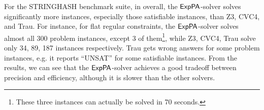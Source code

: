 

For the STRINGHASH benchmark suite, in overall, the ${\sf ExpPA}$-solver solves significantly more instances, especially those satisfiable instances, than Z3, CVC4, and Trau. For instance, for flat regular constraints, the ${\sf ExpPA}$-solver solves almost all 300 problem instances, except 3 of them\footnote{These three instances can actually be solved in 70 seconds.}, while  Z3, CVC4, Trau solve only 34, 89, 187 instances respectively.  Trau gets wrong answers for some problem instances, e.g. it reports ``UNSAT'' for some satisfiable instances. 
From the results, we can see that the ${\sf ExpPA}$-solver achieves a good tradeoff between precision and efficiency, although it is slower than the other solvers. 


%



